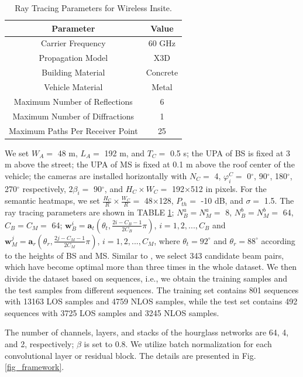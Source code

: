 \documentclass[lettersize,journal]{IEEEtran}
\begin{document}
\begin{table}[!t]
\small
\caption{Ray Tracing Parameters for Wireless Insite.}
\centering
\begin{tabular}{|c||c|}
\hline
Parameter & Value\\
\hline
Carrier Frequency & {60 GHz}\\
\hline
Propagation Model & X3D\\
\hline
Building Material & Concrete\\
\hline
Vehicle Material & Metal\\
\hline
Maximum Number of Reflections & 6\\
\hline
Maximum Number of Diffractions & 1\\
\hline
Maximum Paths Per Receiver Point & 25\\
\hline
\end{tabular}
\label{tab_raytracing}
\end{table}

We set $W_A=$ 48 m, $L_A=$ 192 m, and $T_C=$ 0.5 s; the UPA of BS is fixed at 3 m above the street; the UPA of MS is fixed at 0.1 m above the roof center of the vehicle; the cameras are installed horizontally with $N_C=$ 4, $\varphi_i^C=$ 0$^{\circ}$, 90$^{\circ}$, 180$^{\circ}$, 270$^{\circ}$ respectively, $2\beta_i=$ 90$^{\circ}$, and $H_C\times W_C=$ 192$\times$512 in pixels.
For the semantic heatmaps, we set $\frac{H_C}{R}\times \frac{W_C}{R}=$ 48$\times$128, $P_{th}=$ -10 dB, and $\sigma=$ 1.5. The ray tracing parameters are shown in TABLE \ref{tab_raytracing};
$N_B^a = N_M^a =$ 8, $N_B^b = N_M^b =$ 64, $C_B = C_M =$ 64; 
$\mathbf{w}_B^i = \mathbf{a}_t(\theta_t, \frac{2i - C_B - 1}{2C_B}\pi)$, $i = 1,2,...,C_B$ and $ \mathbf{w}_M^j = \mathbf{a}_r(\theta_r, \frac{2j - C_M - 1}{2C_M}\pi)$, $i = 1,2,...,C_M$, where $\theta_t=92^{\circ}$ and $\theta_r=88^{\circ}$ according to the heights of BS and MS.
Similar to \cite{lidar}, we select 343 candidate beam pairs, which have become optimal more than three times in the whole dataset.
We then divide the dataset based on sequences, i.e., we obtain the training samples and the test samples from different sequences. The training set contains 801 sequences with 13163 LOS samples and 4759 NLOS samples, while the test set contains 492 sequences with 3725 LOS samples and 3245 NLOS samples.

The number of channels, layers, and stacks of the hourglass networks are 64, 4, and 2, respectively; $\beta$ is set to 0.8. %
We utilize batch normalization for each convolutional layer or residual block. The details are presented in Fig. \ref{fig_framework}.
\end{document}
